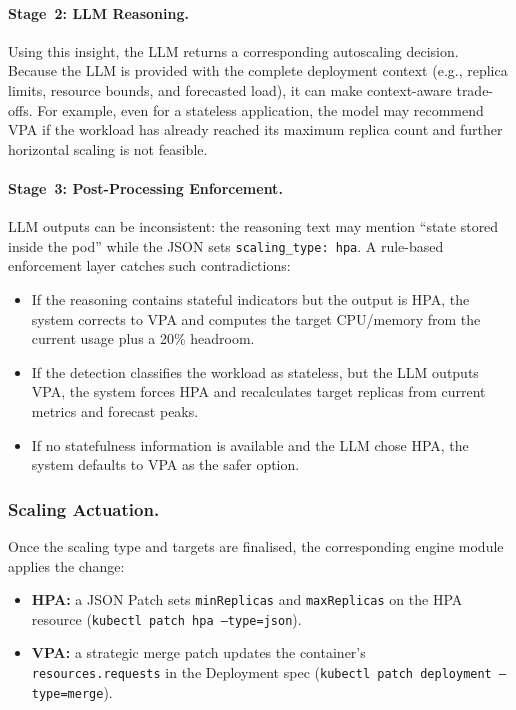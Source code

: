 \documentclass[sigconf]{acmart}
\begin{document}
\paragraph{Stage~2: LLM Reasoning.}
Using this insight, the LLM returns a corresponding autoscaling decision. Because the LLM is provided with the complete deployment context (e.g., replica limits, resource bounds, and forecasted load), it can make context-aware trade-offs. For example, even for a stateless application, the model may recommend VPA if the workload has already reached its maximum replica count and further horizontal scaling is not feasible.

\paragraph{Stage~3: Post-Processing Enforcement.}
LLM outputs can be inconsistent: the reasoning text may mention ``state stored
inside the pod'' while the JSON sets \texttt{scaling\_type:~hpa}.  A
rule-based enforcement layer catches such contradictions:
\begin{itemize}
  \item If the reasoning contains stateful indicators but the output is HPA, the system corrects to VPA and computes the target CPU/memory from the current usage plus a 20\% headroom.
  \item If the detection classifies the workload as stateless, but the LLM outputs VPA, the system forces HPA and recalculates target replicas from current metrics and forecast peaks.
  \item If no statefulness information is available and the LLM chose HPA,
        the system defaults to VPA as the safer option.
\end{itemize}

\subsubsection{Scaling Actuation.}
Once the scaling type and targets are finalised, the corresponding engine module applies the change:
\begin{itemize}
  \item \textbf{HPA:} a JSON Patch sets \texttt{minReplicas} and
        \texttt{maxReplicas} on the HPA resource
        (\texttt{kubectl patch hpa --type=json}).
  \item \textbf{VPA:} a strategic merge patch updates the container's \\
        \texttt{resources.requests} in the Deployment spec
        (\texttt{kubectl patch deployment --type=merge}).
\end{itemize}
\end{document}
